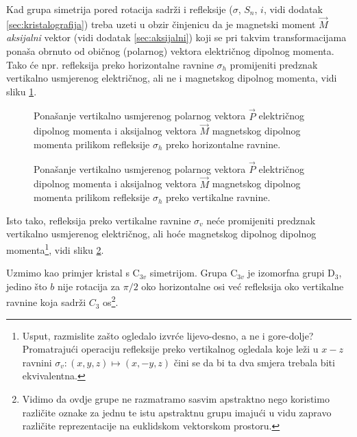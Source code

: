 Kad grupa simetrija pored rotacija sadrži i refleksije ($\sigma$, $S_n$, $i$,
vidi dodatak \ref{sec:kristalografija})  
 treba
uzeti u obzir činjenicu da je magnetski moment $\vec{M}$ \emph{aksijalni}
vektor (vidi dodatak \ref{sec:aksijalni})  
koji se pri takvim transformacijama ponaša obrnuto od običnog
(polarnog) vektora električnog dipolnog momenta. 
Tako će npr. refleksija preko horizontalne ravnine $\sigma_h$ promijeniti
predznak vertikalno usmjerenog električnog, ali ne i
magnetskog dipolnog momenta, vidi sliku \ref{fig:aksijal1}.
\begin{figure}[ht]
    \centerline{}
    \caption{\label{fig:aksijal1}
        Ponašanje vertikalno usmjerenog polarnog vektora $\vec{P}$
        električnog dipolnog momenta
        i aksijalnog vektora $\vec{M}$ magnetskog
    dipolnog momenta prilikom refleksije $\sigma_h$ preko horizontalne ravnine.}
\end{figure}
\begin{figure}[ht]
    \centerline{}
    \caption{\label{fig:aksijal2}
        Ponašanje vertikalno usmjerenog polarnog vektora $\vec{P}$
        električnog dipolnog momenta
        i aksijalnog vektora $\vec{M}$ magnetskog
    dipolnog momenta prilikom refleksije $\sigma_h$ preko vertikalne ravnine.}
\end{figure}
Isto tako, refleksija preko vertikalne ravnine $\sigma_v$ neće promijeniti
predznak vertikalno usmjerenog električnog, ali hoće
magnetskog dipolnog dipolnog momenta\footnote{ 
Usput, razmislite zašto ogledalo izvrće lijevo-desno, a ne i gore-dolje? Promatrajući
operaciju refleksije preko vertikalnog ogledala koje leži
u $x-z$ ravnini $\sigma_v:(x, y, z)\mapsto (x, -y, z)$
čini se da bi ta dva smjera trebala biti ekvivalentna.}, vidi sliku \ref{fig:aksijal2}.

Uzmimo kao primjer kristal s C$_{3v}$ simetrijom. 
Grupa C$_{3v}$ je izomorfna grupi D$_3$, jedino što $b$ nije rotacija
za $\pi/2$ oko horizontalne osi već refleksija oko vertikalne ravnine
koja sadrži $C_3$ os\footnote{Vidimo da ovdje grupe ne razmatramo sasvim 
apstraktno nego koristimo različite oznake za jednu te istu apstraktnu
grupu imajući u vidu zapravo različite reprezentacije na euklidskom
vektorskom prostoru.}.

